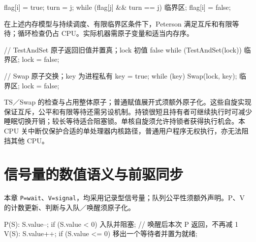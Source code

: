 \par\smallskip\noindent\begin{minipage}{\linewidth}
\begin{codeblock}[language={}]
flag[i] = true;
turn = j;
while (flag[j] && turn == j) { }
临界区;
flag[i] = false;
\end{codeblock}
\end{minipage}\par\smallskip

在上述内存模型与持续调度、有限临界区条件下，Peterson 满足互斥和有限等待；循环检查仍占 CPU。实际机器需原子变量和适当内存序。

\par\smallskip\noindent\begin{minipage}{\linewidth}
\begin{codeblock}[language={}]
// TestAndSet 原子返回旧值并置真；lock 初值 false
while (TestAndSet(lock)) { }
临界区;
lock = false;

// Swap 原子交换；key 为进程私有
key = true;
while (key) Swap(lock, key);
临界区;
lock = false;
\end{codeblock}
\end{minipage}\par\smallskip

TS／Swap 的检查与占用整体原子；普通赋值展开式须额外原子化。这些自旋实现保证互斥，公平和有限等待还需另设机制。持锁很短且持有者可继续执行时可减少睡眠切换开销；较长等待适合阻塞锁。单核自旋须允许持锁者获得执行机会。本 CPU 关中断仅保护合适的单处理器内核路径，普通用户程序无权执行，亦无法阻挡其他 CPU。

\section{信号量的数值语义与前驱同步}\label{OS02-semaphores}

本章 \texttt{P=\allowbreak{}wait}、\texttt{V=\allowbreak{}signal}，均采用记录型信号量；队列公平性须额外声明。P、V 的计数更新、判断与入队／唤醒须原子化。

\par\smallskip\noindent\begin{minipage}{\linewidth}
\begin{codeblock}[language={}]
P(S): S.value--;
      if (S.value < 0) 入队并阻塞;
      // 唤醒后本次 P 返回，不再减 1
V(S): S.value++;
      if (S.value <= 0) 移出一个等待者并置为就绪;
\end{codeblock}
\end{minipage}\par\smallskip

